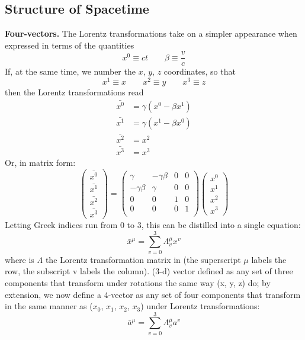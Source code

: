 \documentclass[../../main.tex]{subfiles}
\begin{document}
\subsection{Structure of Spacetime}
\textbf{Four-vectors.} The Lorentz transformations take on a simpler appearance when expressed in terms of the quantities
\begin{equation*}
    x^0\equiv ct\qquad \beta\equiv \frac{v}{c}
\end{equation*}
If, at the same time, we number the $x$, $y$, $z$ coordinates, so that
\begin{equation*}
    x^1\equiv x\qquad x^2\equiv y\qquad x^3\equiv z
\end{equation*}
then the Lorentz transformations read
\begin{align*}
    \bar{x^0} &= \gamma (x^0 - \beta x^1)\\
    \bar{x^1} &= \gamma(x^1-\beta x^0)\\
    \bar{x^2} &= x^2\\
    \bar{x^3}&=x^3
\end{align*}
Or, in matrix form:
\begin{equation*}
    \begin{pmatrix}
        \bar{x^0}\\
        \bar{x^1}\\
        \bar{x^2}\\
        \bar{x^3}
    \end{pmatrix}=
    \begin{pmatrix}
        \gamma&-\gamma\beta&0&0\\
        -\gamma\beta&\gamma&0&0\\
        0&0&1&0\\
        0&0&0&1\\
    \end{pmatrix}
    \begin{pmatrix}
        {x^0}\\
        {x^1}\\
        {x^2}\\
        {x^3}
    \end{pmatrix}
\end{equation*}
Letting Greek indices run from 0 to 3, this can be distilled into a single equation:
\begin{equation*}
\bar{x}^{\mu}=\sum_{v=0}^{3}\Lambda_{v}^{\mu}x^v
\end{equation*}
where is $\Lambda$ the Lorentz transformation matrix in (the superscript $\mu$ labels the row, the subscript v labels the column). (3-d) vector defined as any set of three components that transform under rotations the same way (x, y, z) do; by extension, we now define a 4-vector as any set of four components that transform in the same manner as ($x_0$, $x_1$, $x_2$, $x_3$) under Lorentz transformations:
\begin{equation*}
\bar{a}^{\mu}=\sum_{v=0}^{3}\Lambda_{v}^{\mu}a^v
\end{equation*}
\end{document}
